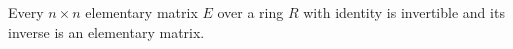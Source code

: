 Every $n \times n$ elementary matrix $E$ over a ring $R$ with identity is invertible and its inverse is an elementary matrix.
